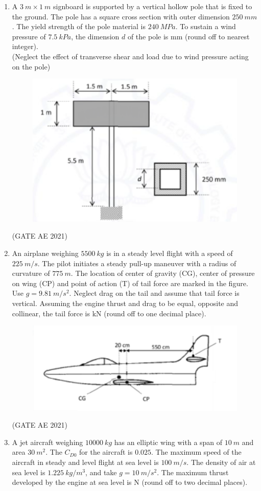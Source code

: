 \documentclass[journal,12pt,onecolumn]{IEEEtran}
\theoremstyle{remark}
\begin{document}
\begin{flushleft}
\begin{enumerate}
\item 
A $3~m \times 1~m$ signboard is supported by a vertical hollow pole that is fixed to the ground. The pole has a square cross section with outer dimension $250~mm$. The yield strength of the pole material is $240~MPa$. To sustain a wind pressure of $7.5~kPa$, the dimension $d$ of the pole is \underline{\hfill} mm (round off to nearest integer). \\
(Neglect the effect of transverse shear and load due to wind pressure acting on the pole)
\begin{figure}[H]
    \centering
    \includegraphics[width=0.5\columnwidth]{figs/52.png}
    \caption{}
    \label{fig:placeholder}
\end{figure}

\hfill (GATE AE 2021)

\item 
An airplane weighing $5500~kg$ is in a steady level flight with a speed of $225~m/s$. The pilot initiates a steady pull-up maneuver with a radius of curvature of $775~m$. The location of center of gravity (CG), center of pressure on wing (CP) and point of action (T) of tail force are marked in the figure. Use $g=9.81~m/s^{2}$. Neglect drag on the tail and assume that tail force is vertical. Assuming the engine thrust and drag to be equal, opposite and collinear, the tail force is \underline{\hfill} kN (round off to one decimal place).
\begin{figure}[H]
    \centering
    \includegraphics[width=0.5\columnwidth]{figs/53.png}
    \caption{}
    \label{fig:placeholder}
\end{figure}
\hfill (GATE AE 2021)

\item 
A jet aircraft weighing $10000~kg$ has an elliptic wing with a span of $10~m$ and area $30~m^{2}$. The $C_{D0}$ for the aircraft is $0.025$. The maximum speed of the aircraft in steady and level flight at sea level is $100~m/s$. The density of air at sea level is $1.225~kg/m^{3}$, and take $g=10~m/s^{2}$. The maximum thrust developed by the engine at sea level is \underline{\hfill} N (round off to two decimal places).


\end{enumerate}
\end{flushleft}
\end{document}
